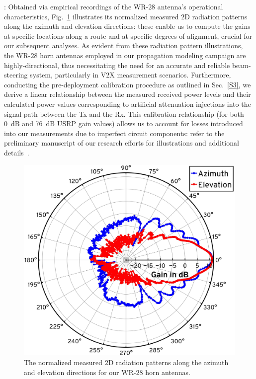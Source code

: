 \documentclass[10pt, twocolumn]{IEEEtran}
\begin{document}
{: Obtained via empirical recordings of the WR-$28$ antenna's operational characteristics, Fig.~\ref{F4} illustrates its normalized measured $2$D radiation patterns along the azimuth and elevation directions: these enable us to compute the gains at specific locations along a route and at specific degrees of alignment, crucial for our subsequent analyses. As evident from these radiation pattern illustrations, the WR-$28$ horn antennas employed in our propagation modeling campaign are highly-directional, thus necessitating the need for an accurate and reliable beam-steering system, particularly in V$2$X measurement scenarios. Furthermore, conducting the pre-deployment calibration procedure as outlined in Sec.~\ref{S3}, we derive a linear relationship between the measured received power levels and their calculated power values corresponding to artificial attenuation injections into the signal path between the Tx and the Rx. This calibration relationship (for both \SI{0}{\deci\bel} and \SI{76}{\deci\bel} USRP gain values) allows us to account for losses introduced into our measurements due to imperfect circuit components: refer to the preliminary manuscript of our research efforts for illustrations and additional details~\cite{SPAVE_ICC}.
\begin{figure} [t]
    \centering
    \includegraphics[width=0.55\linewidth]{figs/antenna_patterns.pdf}
    \vspace{-2mm}
    \caption{The normalized measured $2$D radiation patterns along the azimuth and elevation directions for our WR-$28$ horn antennas.}
    \label{F4}
\end{figure}

}
\end{document}
